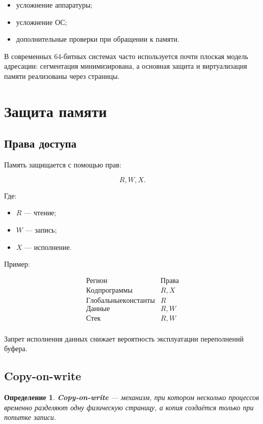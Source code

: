\documentclass[a4paper,12pt]{article}
\newtheorem{definition}{Определение}
\begin{document}
\begin{itemize}
    \item усложнение аппаратуры;
    \item усложнение ОС;
    \item дополнительные проверки при обращении к памяти.
\end{itemize}

В современных 64-битных системах часто используется почти плоская модель адресации: сегментация минимизирована, а основная защита и виртуализация памяти реализованы через страницы.

\section{Защита памяти}

\subsection{Права доступа}

Память защищается с помощью прав:

\[
R, W, X.
\]

Где:

\begin{itemize}
    \item $R$ --- чтение;
    \item $W$ --- запись;
    \item $X$ --- исполнение.
\end{itemize}

Пример:

\[
\begin{array}{c|c}
\text{Регион} & \text{Права} \\
\hline
Код программы & R,X \\
Глобальные константы & R \\
Данные & R,W \\
Стек & R,W \\
\end{array}
\]

Запрет исполнения данных снижает вероятность эксплуатации переполнений буфера.

\subsection{Copy-on-write}

\begin{definition}
\textbf{Copy-on-write} --- механизм, при котором несколько процессов временно разделяют одну физическую страницу, а копия создаётся только при попытке записи.
\end{definition}
\end{document}
